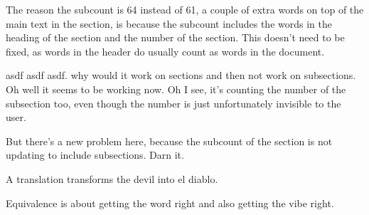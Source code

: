 \documentclass[a4paper,11pt]{article}
\begin{document}

The reason the subcount is 64 instead of 61, a couple of extra words on top of the main text in the section, is because the subcount includes the words in the heading of the section and the number of the section. This doesn't need to be fixed, as words in the header do usually count as words in the document. 





asdf asdf asdf. why would it work on sections and then not work on subsections. Oh well it seems to be working now. Oh I see, it's counting the number of the subsection too, even though the number is just unfortunately invisible to the user.



But there's a new problem here, because the subcount of the section is not updating to include subsections. Darn it. 




A translation transforms the devil into el diablo. %


Equivalence is about getting the word right and also getting the vibe right. %





\end{document}

